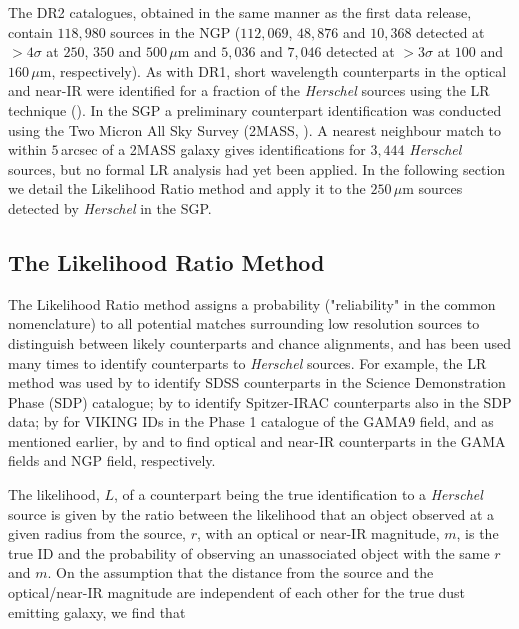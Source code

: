 The DR2 catalogues, obtained in the same manner as the first data release, contain $118,980$ sources in the NGP ($112,069$, $48,876$ and $10,368$ detected at $> 4\sigma$ at $250$, $350$ and $500\,\mu$m and $5,036$ and $7,046$ detected at $> 3\sigma$ at $100$ and $160\,\mu$m, respectively). As with DR1, short wavelength counterparts in the optical and near-IR were identified for a fraction of the \textit{Herschel} sources using the LR technique (\citealt{Furlanetto_2018}). In the SGP a preliminary counterpart identification was conducted using the Two Micron All Sky Survey (2MASS, \citealt{Skrutskie_2006}). A nearest neighbour match to within $5\,$arcsec of a 2MASS galaxy gives identifications for $3,444$ \textit{Herschel} sources, but no formal LR analysis had yet been applied. In the following section we detail the Likelihood Ratio method and apply it to the $250\,\mu$m sources detected by \textit{Herschel} in the SGP.

\subsection{The Likelihood Ratio Method}
\label{sec:The Likelihood Ratio Method}

The Likelihood Ratio method assigns a probability ("reliability" in the common nomenclature) to all potential matches surrounding low resolution sources to distinguish between likely counterparts and chance alignments, and has been used many times to identify counterparts to \textit{Herschel} sources. For example, the LR method was used by \citealt{Smith_2011} to identify SDSS counterparts in the Science Demonstration Phase (SDP) catalogue; by \citealt{Kim_2012} to identify Spitzer-IRAC counterparts also in the SDP data; by \citealt{Fleuren_2012} for VIKING IDs in the Phase 1 catalogue of the GAMA9 field, and as mentioned earlier, by \citealt{Bourne_2016} and \citealt{Furlanetto_2018} to find optical and near-IR counterparts in the GAMA fields and NGP field, respectively.

The likelihood, $L$, of a counterpart being the true identification to a \textit{Herschel} source is given by the ratio between the likelihood that an object observed at a given radius from the source, $r$, with an optical or near-IR magnitude, $m$, is the true ID and the probability of observing an unassociated object with the same $r$ and $m$. On the assumption that the distance from the source and the optical/near-IR magnitude are independent of each other for the true dust emitting galaxy, we find that

